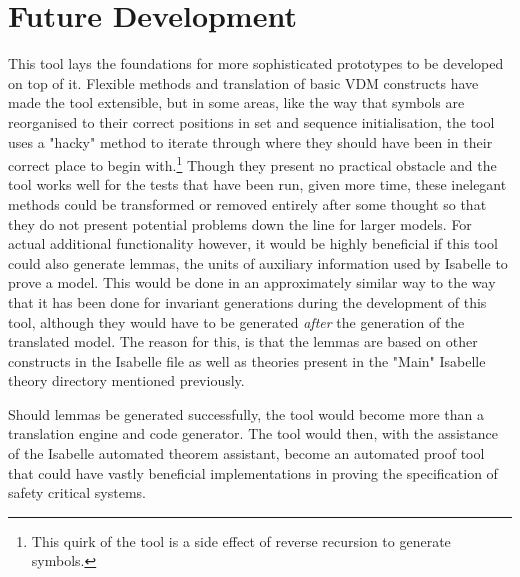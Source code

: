 \section{Future Development}
This tool lays the foundations for more sophisticated prototypes to be developed on top of it. Flexible methods and translation of basic VDM constructs have made the tool extensible, but in some areas, like the way that symbols are reorganised to their correct positions in set and sequence initialisation, the tool uses a "hacky" method to iterate through where they should have been in their correct place to begin with.\footnote{This quirk of the tool is a side effect of reverse recursion to generate symbols.} Though they present no practical obstacle and the tool works well for the tests that have been run, given more time, these inelegant methods could be transformed or removed entirely after some thought so that they do not present potential problems down the line for larger models. For actual additional functionality however, it would be highly beneficial if this tool could also generate lemmas, the units of auxiliary information used by Isabelle to prove a model. This would be done in an approximately similar way to the way that it has been done for invariant generations during the development of this tool, although they would have to be generated \emph{after} the generation of the translated model. The reason for this, is that the lemmas are based on other constructs in the Isabelle file as well as theories present in the "Main" Isabelle theory directory mentioned previously. 

Should lemmas be generated successfully, the tool would become more than a translation engine and code generator. The tool would then, with the assistance of the Isabelle automated theorem assistant, become an automated proof tool that could have vastly beneficial implementations in proving the specification of safety critical systems.  


